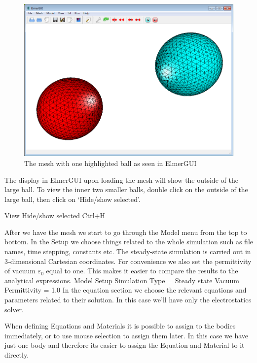 \begin{figure}[h]
\centering
\includegraphics[width=140mm]{ElmerGUI_capture}
\caption{The mesh with one highlighted ball as seen in ElmerGUI}\label{fg:ballselmergui}
\end{figure}  

The display in ElmerGUI upon loading the mesh will show the outside of the large ball.  
To view the inner two smaller balls, double click on the outside of the large ball, then 
click on `Hide/show selected'.

\ttbegin
View 
  Hide/show selected   Ctrl+H
\ttend


After we have the mesh we start to go through the Model menu from the top to bottom. 
In the Setup we choose things related to the whole simulation such as file names, 
time stepping, constants etc.
The steady-state simulation is carried out in 3-dimensional Cartesian
coordinates. For convenience we also set the permittivity of vacuum $\varepsilon_0$ equal to one.
This makes it easier to compare the results to the analytical expressions. 
\ttbegin
Model
  Setup 
    Simulation Type = Steady state
    Vacuum Permittivity = 1.0
\ttend
In the equation section we choose the relevant equations and parameters related to their solution. 
In this case we'll have only the electrostatics solver. 

When defining Equations and Materials it is possible to assign to the bodies immediately, or to use mouse
selection to assign them later. In this case we have just one body and therefore its easier to assign 
the Equation and Material to it directly.

